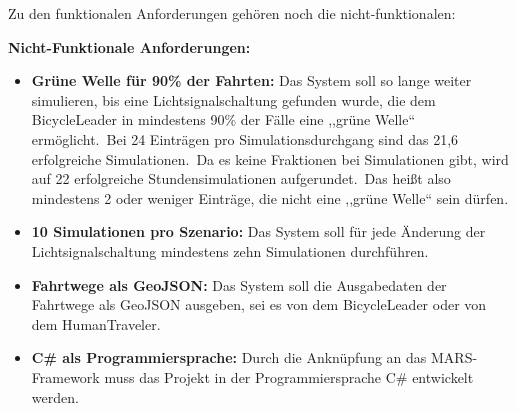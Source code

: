 Zu den funktionalen Anforderungen gehören noch die nicht-funktionalen:

\textbf{Nicht-Funktionale Anforderungen:}

\begin{itemize}
    \item \textbf{Grüne Welle für 90\% der Fahrten:} Das System soll so lange weiter simulieren, bis eine Lichtsignalschaltung gefunden wurde, die dem BicycleLeader in mindestens 90\% der Fälle eine ,,grüne Welle`` ermöglicht.~Bei 24 Einträgen pro Simulationsdurchgang sind das 21,6 erfolgreiche Simulationen.~Da es keine Fraktionen bei Simulationen gibt, wird auf 22 erfolgreiche Stundensimulationen aufgerundet.~Das heißt also mindestens 2 oder weniger Einträge, die nicht eine ,,grüne Welle`` sein dürfen.
    \item \textbf{10 Simulationen pro Szenario:} Das System soll für jede Änderung der Lichtsignalschaltung mindestens zehn Simulationen durchführen.
    \item \textbf{Fahrtwege als GeoJSON:} Das System soll die Ausgabedaten der Fahrtwege als GeoJSON ausgeben, sei es von dem BicycleLeader oder von dem HumanTraveler.
    \item \textbf{C\# als Programmiersprache:} Durch die Anknüpfung an das MARS-Framework muss das Projekt in der Programmiersprache C\# entwickelt werden.
\end{itemize}
